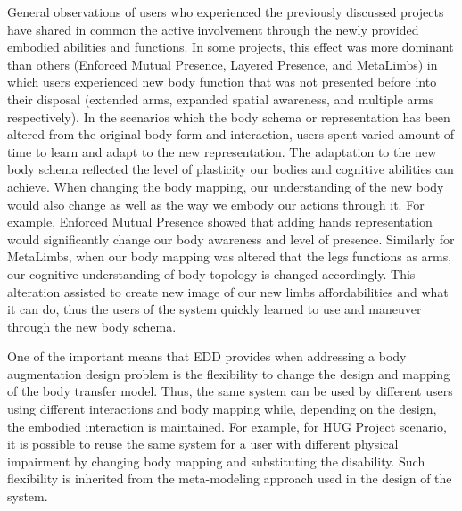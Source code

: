 
General observations of users who experienced the previously discussed projects have shared in common the active involvement through the newly provided embodied abilities and functions. In some projects, this effect was more dominant than others (Enforced Mutual Presence, Layered Presence, and MetaLimbs) in which users experienced new body function that was not presented before into their disposal (extended arms,  expanded spatial awareness, and multiple arms respectively). In the scenarios which the body schema or representation has been altered from the original body form and interaction, users spent varied amount of time to learn and adapt to the new representation. The adaptation to the new body schema reflected the level of plasticity our bodies and cognitive abilities can achieve. When changing the body mapping, our understanding of the new body would also change as well as the way we embody our actions through it. For example, Enforced Mutual Presence showed that adding hands representation would significantly change our body awareness and level of presence. Similarly for MetaLimbs, when our body mapping was altered that the legs functions as arms, our cognitive understanding of body topology is changed accordingly. This alteration assisted to create new image of our new limbs affordabilities and what it can do, thus the users of the system quickly learned to use and maneuver through the new body schema.

One of the important means that EDD provides when addressing a body augmentation design problem is the flexibility to change the design and mapping of the body transfer model. Thus, the same system can be used by different users using different interactions and body mapping while, depending on the design, the embodied interaction is maintained. For example, for HUG Project scenario, it is possible to reuse the same system for a user with different physical impairment by changing body mapping and substituting the disability. Such flexibility is inherited from the meta-modeling approach used in the design of the system.







